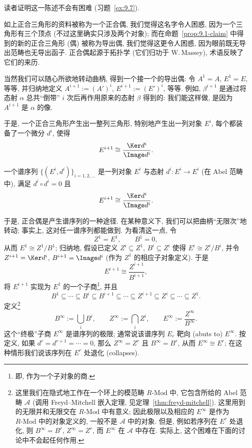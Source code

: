 读者证明这一陈述不会有困难 (习题~\ref{ex:9.7}).

如上正合三角形的资料被称为一个正合偶, 我们觉得这名字令人困惑, 因为一个三角形有三个顶点 (不过这里确实只涉及两个对象); 而在命题~\ref{prop:9.1-claim} 中得到的新的正合三角形 (偶) 被称为导出偶, 我们觉得这更令人困惑, 因为眼前既无导出范畴也无导出函子. 正合偶起源于拓扑学 (它们归功于 W.\,Massey), 术语反映了它们的来历.

当然我们可以随心所欲地转动曲柄, 得到一个接一个的导出偶: 令 $A^1=A$, $E^1=E$, 等等, 并归纳地定义 $A^{i+1}:=(A')^i$, $E^{i+1}:=(E')^i$, 等等. 例如, $\beta^{i+1}$ 是通过将态射 $\alpha$ 总共“倒带” $i$ 次后再作用原来的态射 $\beta$ 得到的: 我们能这样做, 是因为 $A^{i+1}$ 是 $\alpha$ 的像.

于是, 一个正合三角形产生出一整列三角形, 特别地产生出一列对象 $E^i$, 每个都装备了一个微分 $d^i$, 使得
\[
E^{i+1}\cong \frac{\Ker d^i}{\Image d^i}.
\]

\begin{definition}\label{def:9.2-spectral-sequence}
一个谱序列 $\{(E^i,d^i)\}_{i=1,2,\dots}$ 是一列对象 $E^i$ 与态射 $d^i:E^i\to E^i$ (在 Abel 范畴中), 满足 $d^i\circ d^i=0$ 且
\[
E^{i+1}\cong \frac{\Ker d^i}{\Image d^i}.
\]
\end{definition}

于是, 正合偶是产生谱序列的一种途径. 在某种意义下, 我们可以把曲柄“无限次”地转动; 事实上, 这对任一谱序列都能做到. 为看清这一点, 令
\[
Z^1=E^1,\qquad B^1=0,
\]
从而 $E^1\cong Z^1/B^1$; 归纳地, 假设已定义 $Z^i\subseteq Z^1$, $B^i\subseteq Z^i$ 使得 $E^i\cong Z^i/B^i$, 并令 $Z^{i+1}=\Ker d^i$, $B^{i+1}=\Image d^i$ (作为 $Z^1$ 的相应子对象定义). 于是
\[
E^{i+1}\cong \frac{Z^{i+1}}{B^{i+1}},
\]
将 $E^{i+1}$ 实现为 $E^1$ 的一个子商\footnote{即, 作为一个子对象的商.}, 并且
\[
B^1\subseteq\cdots\subseteq B^i\subseteq B^{i+1}\subseteq\cdots\subseteq Z^{i+1}\subseteq Z^i\subseteq\cdots\subseteq Z^1.
\]
定义\footnote{这里我们在隐式地工作在一个环上的模范畴 $R\text{-}\mathrm{Mod}$ 中, 它包含所给的 Abel 范畴 $\mathcal{A}$ (调用 Freyd–Mitchell 嵌入定理, 见定理~\ref{thm:freyd-mitchell}). 这里用到的无限并和无限交在 $R\text{-}\mathrm{Mod}$ 中有意义; 因此极限以及相应的 $E^\infty$ 是作为 $R\text{-}\mathrm{Mod}$ 中的对象定义的, 一般不是 $\mathcal{A}$ 中的对象. 但是, 例如若序列在 $E^r$ 处退化, 则 $B^\infty=B^r$, $Z^\infty=Z^r$, 而 $E^\infty$ 在 $\mathcal{A}$ 中存在. 实际上, 这个困难在下面的讨论中不会起任何作用.}
\[
B^\infty := \bigcup_i B^i,\qquad Z^\infty := \bigcap_i Z^i,\qquad E^\infty := \frac{Z^\infty}{B^\infty}.
\]
这个“终极”子商 $E^\infty$ 是谱序列的极限; 通常说该谱序列 $E_r$ 靶向 (abuts to) $E^\infty$. 按定义, 如果 $d^r=d^{r+1}=\cdots=0$, 那么 $Z^\infty=Z^r$ 且 $B^\infty=B^r$, 从而 $E^\infty\cong E^r$; 在这种情形我们说该序列在 $E^r$ 处退化 (collapses).

